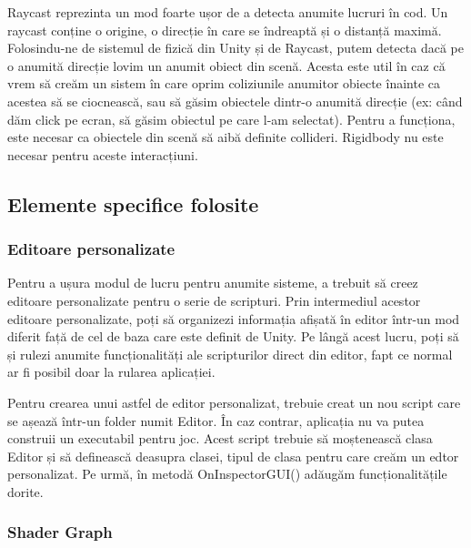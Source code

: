 \documentclass[12pt, a4paper]{article}
\begin{document}
	Raycast reprezinta un mod foarte ușor de a detecta anumite lucruri în cod. Un raycast conține o origine, o direcție în care se îndreaptă și o distanță maximă. Folosindu-ne de sistemul de fizică din Unity și de Raycast, putem detecta dacă pe o anumită direcție lovim un anumit obiect din scenă. Acesta este util în caz că vrem să creăm un sistem în care oprim coliziunile anumitor obiecte înainte ca acestea să se ciocnească, sau să găsim obiectele dintr-o anumită direcție (ex: când dăm click pe ecran, să găsim obiectul pe care l-am selectat). Pentru a funcționa, este necesar ca obiectele din scenă să aibă definite collideri. Rigidbody nu este necesar pentru aceste interacțiuni.
	
	
	
	
	\subsection{Elemente specifice folosite}
	\label{section: specificElements}	
	
	\subsubsection{Editoare personalizate}
	
	Pentru a ușura modul de lucru pentru anumite sisteme, a trebuit să creez editoare personalizate pentru o serie de scripturi. Prin intermediul acestor editoare personalizate, poți să organizezi informația afișată în editor într-un mod diferit față de cel de baza care este definit de Unity. Pe lângă acest lucru, poți să și rulezi anumite funcționalități ale scripturilor direct din editor, fapt ce normal ar fi posibil doar la rularea aplicației.
	\newline
	
	Pentru crearea unui astfel de editor personalizat, trebuie creat un nou script care se așează într-un folder numit Editor. În caz contrar, aplicația nu va putea construii un executabil pentru joc. Acest script trebuie să moștenească clasa Editor și să definească deasupra clasei, tipul de clasa pentru care creăm un edtor personalizat. Pe urmă, în metodă OnInspectorGUI() adăugăm funcționalitățile dorite.
	
	
	
	
	
	\subsubsection{Shader Graph}
	
\end{document}
